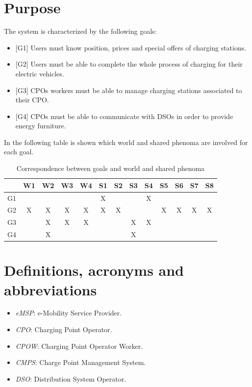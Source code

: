 \documentclass[a4paper]{report}
\begin{document}
\section{Purpose}
The system is characterized by the following goals:
\begin{itemize}
\item{[G1]} \label{G1}Users must know position, prices and special offers of charging stations.
\item {[G2]} \label{G2}Users must be able to complete the whole process of charging for their electric vehicles.	
\item  {[G3]} \label{G3}CPOs workers must be able to manage charging stations associated to their CPO.
\item  {[G4]} \label{G4}CPOs must be able to communicate with DSOs in order to provide energy furniture.
\end{itemize}

In the following table is shown which world and shared phenoma are involved for each goal.
\begin{table}[H]  
  \centering
  \begin{tabular}{|c|c|c|c|c|c|c|c|c|c|c|c|c|}
    \cline{2-13}
    \multicolumn{1}{c|}{} & W1 & W2 & W3 & W4 & S1 & S2 & S3 & S4 & S5 & S6 & S7 & S8\\ \hline
    G1 &   &   &   &   & X &   &   & X &   &   &   &   \\ \hline
    G2 & X & X & X & X & X & X &   &   & X & X & X & X \\ \hline
    G3 &   & X & X & X &   &   & X & X &   &   &   &   \\ \hline
    G4 &   & X &   &   &   &   & X &   &   &   &   &   \\ \hline
  \end{tabular}
  \caption{Correspondence between goals and world and shared phenoma}
\end{table}


\section{Definitions, acronyms and abbreviations}
\begin{itemize}
\item \textit{eMSP}: e-Mobility Service Provider.
\item \textit{CPO}: Charging Point Operator.
\item \textit{CPOW}: Charging Point Operator Worker.
\item \textit{CMPS}: Charge Point Management System.
\item \textit{DSO}: Distribution System Operator.
\end{itemize}
\end{document}
